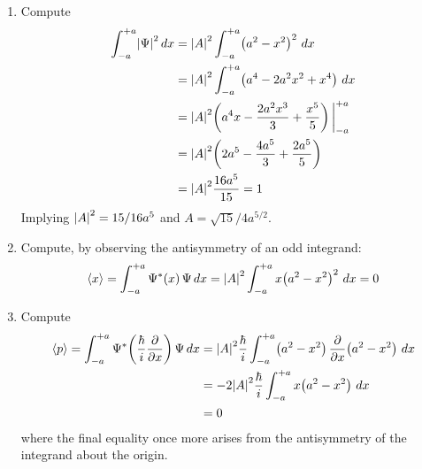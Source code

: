 \documentclass[a4paper]{article}
\begin{document}
\begin{enumerate}[label=(\alph*)]
	\item Compute
	\begin{align*}
		\int^{+a}_{-a} \abs{\Psi}^{2} \, dx & = \abs{A}^{2}\int^{+a}_{-a} \!\left( a^{2} - x^{2} \right)^{2} \, dx \\
						    & = \abs{A}^{2}\int^{+a}_{-a} \!\left( a^{4} - 2a^{2}x^{2} + x^{4} \right) \, dx \\
						    & = \abs{A}^{2}\!\left( a^{4}x - \frac{2a^{2}x^{3}}{3} + \frac{x^{5}}{5} \right)\bigg|^{+a}_{-a} \\
						    & = \abs{A}^{2}\!\left( 2a^{5} - \frac{4a^{5}}{3} + \frac{2a^{5}}{5} \right) \\
						    & = \abs{A}^{2}\frac{16a^{5}}{15} = 1
	\end{align*}
	Implying \( \abs{A}^{2} = 15 / 16a^{5} \) and \( A = \sqrt{15} / 4a^{5/2} \).
	\item Compute, by observing the antisymmetry of an odd integrand:
	\[
		\braket{x} = \int^{+a}_{-a} \Psi^{*}\!\left( x \right)\Psi \, dx = \abs{A}^{2}\int^{+a}_{-a} x \!\left( a^{2} - x^{2} \right)^{2} \, dx = 0 
	\]
	\item Compute 
	\begin{align*}
		\braket{p} = \int^{+a}_{-a} \Psi^{*}\!\left( \frac{\hbar}{i}\frac{\partial }{\partial x} \right)\Psi \, dx & = \abs{A}^{2}\frac{\hbar}{i}\int^{+a}_{-a} \!\left( a^{2} - x^{2} \right)\frac{\partial }{\partial x}\!\left( a^{2} - x^{2} \right) \, dx \\
		 & = -2\abs{A}^{2}\frac{\hbar}{i}\int^{+a}_{-a} x \!\left( a^{2} - x^{2} \right) \, dx \\ 
		 & = 0
	\end{align*}
	where the final equality once more arises from the antisymmetry of the integrand about the origin.


\end{enumerate}
\end{document}
